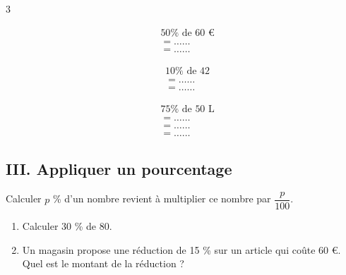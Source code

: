 \begin{Exemple}
\vspace{-1.5cm}
\begin{multicols}{3}

\begin{align*}
&50\% \text{ de } 60\text{ €}\\
&=  \ldots\ldots \\
&= \ldots\ldots
\end{align*}

\begin{align*}
&10\% \text{ de } 42\\
&= \ldots\ldots \\
&= \ldots\ldots
\end{align*}

\begin{align*}
&75\% \text{ de } 50 \text{ L}\\
&= \ldots\ldots\\
&= \ldots\ldots \\
&= \ldots\ldots
\end{align*}

\end{multicols}
\vspace{-0.5cm}
\end{Exemple}

\subsection*{III. Appliquer un pourcentage}

\begin{Règle}[c]
Calculer $p$ \% d'un nombre revient à multiplier ce nombre par $\dfrac{p}{100}$.
\end{Règle}

\begin{Exemples}
\begin{enumerate}
\item Calculer 30 \% de 80. 

\ligne




\item Un magasin propose une réduction de 15 \% sur un article qui coûte 60 €.\\ Quel est le montant de la réduction ?

\ligne

\ligne


\end{enumerate}
\end{Exemples}